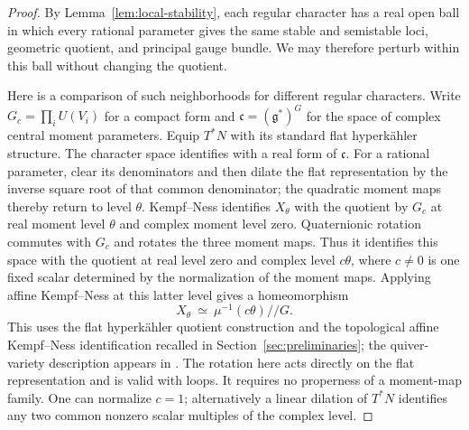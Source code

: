 \begin{proof}
By Lemma~\ref{lem:local-stability}, each regular character has a real open
ball in which every rational parameter gives the same stable and semistable
loci, geometric quotient, and principal gauge bundle.  We may therefore
perturb within this ball without changing the quotient.

Here is a comparison of such neighborhoods for different regular
characters.  Write $G_c=\prod_i U(V_i)$ for a compact form and
$\mathfrak c=(\mathfrak g^*)^G$ for the space of complex central moment
parameters.  Equip $T^*N$ with its standard flat hyperk\"ahler structure.
The character space identifies with a real form of $\mathfrak c$.
For a rational parameter, clear its denominators and then dilate the
flat representation by the inverse square root of that common denominator;
the quadratic moment maps thereby return to level $\theta$.
Kempf--Ness identifies $X_\theta$ with the quotient by $G_c$ at real moment
level $\theta$ and complex moment level zero.  Quaternionic rotation commutes
with $G_c$ and rotates the three moment maps.  Thus it identifies this space
with the quotient at real level zero and complex level $c\theta$, where
$c\ne0$ is one fixed scalar determined by the normalization of the moment
maps.  Applying affine Kempf--Ness at this latter level gives a homeomorphism
\begin{equation}\label{eq:rotation-affine-fiber}
 X_\theta\ \simeq\ \mu^{-1}(c\theta)/\!/G .
\end{equation}
This uses the flat hyperk\"ahler quotient construction
\cite[Section~3(D)]{HKLR87} and the topological affine Kempf--Ness
identification recalled in Section~\ref{sec:preliminaries}; the
quiver-variety description appears in
\cite{Nakajima94}.  The rotation here acts directly on the flat
representation and is valid with loops.  It requires no properness of a
moment-map family.  One can normalize $c=1$; alternatively a linear dilation
of $T^*N$ identifies any two common nonzero scalar multiples of the complex
level.


\end{proof}
